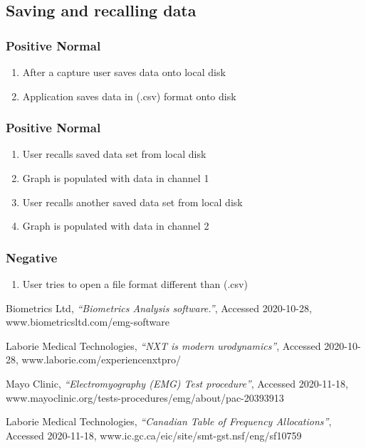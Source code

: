 \documentclass[12pt,a4paper]{article}
\begin{document}
\subsection{Saving and recalling data}

\subsubsection{Positive Normal}

\begin{enumerate}
	\item After a capture user saves data onto local disk
	\item Application saves data in (.csv) format onto disk
\end{enumerate}

\subsubsection{Positive Normal}

\begin{enumerate}
	\item User recalls saved data set from local disk
	\item Graph is populated with data in channel 1
	\item User recalls another saved data set from local disk
	\item Graph is populated with data in channel 2
\end{enumerate}

\subsubsection{Negative}

\begin{enumerate}
	\item User tries to open a file format different than (.csv)  
\end{enumerate}

\newpage
\begin{thebibliography}{9}

  Biometrics Ltd,
  \textit{“Biometrics Analysis software.”},
  Accessed 2020-10-28,
  www.biometricsltd.com/emg-software
  
  Laborie Medical Technologies,
  \textit{“NXT is modern urodynamics”},
  Accessed 2020-10-28,
  www.laborie.com/experiencenxtpro/

  Mayo Clinic,
  \textit{“Electromyography (EMG) Test procedure”},
  Accessed 2020-11-18,
  www.mayoclinic.org/tests-procedures/emg/about/pac-20393913

  Laborie Medical Technologies,
  \textit{“Canadian Table of Frequency Allocations”},
  Accessed 2020-11-18,
  www.ic.gc.ca/eic/site/smt-gst.nsf/eng/sf10759
 
\end{thebibliography}
\end{document}
